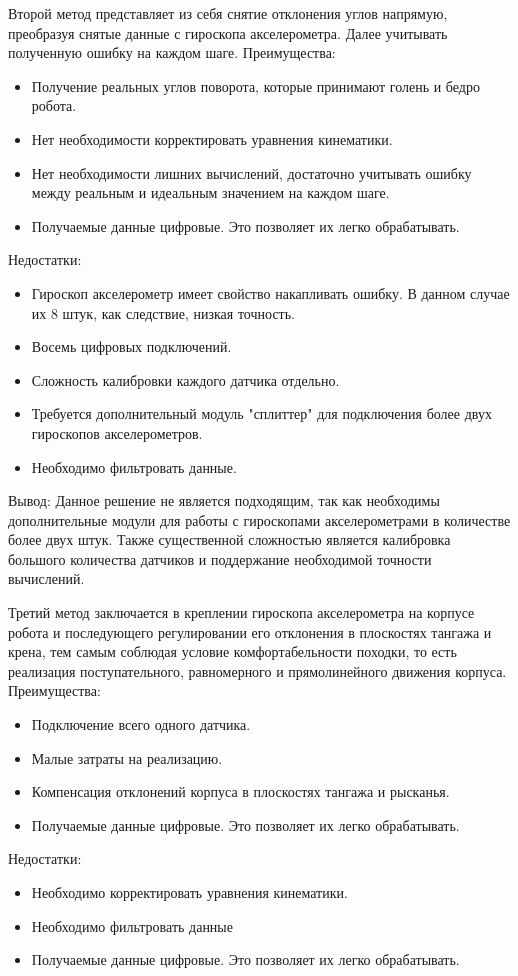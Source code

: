 Второй метод представляет из себя снятие отклонения углов напрямую, преобразуя снятые данные с гироскопа акселерометра. Далее учитывать полученную ошибку на каждом шаге.
\newline
Преимущества:
 \begin{itemize}
 	\item Получение реальных углов поворота, которые принимают голень и бедро робота.
 	\item Нет необходимости корректировать уравнения кинематики.
 	\item Нет необходимости лишних вычислений, достаточно учитывать ошибку между реальным и идеальным значением на каждом шаге.
 	\item Получаемые данные цифровые. Это позволяет их легко обрабатывать.
 \end{itemize}
Недостатки:
\begin{itemize}
\item Гироскоп акселерометр имеет свойство накапливать ошибку. В данном случае их 8 штук, как следствие, низкая точность.
\item Восемь цифровых подключений.
\item Сложность калибровки каждого датчика отдельно.
\item Требуется дополнительный модуль "сплиттер" для подключения более двух гироскопов акселерометров.
\item Необходимо фильтровать данные.
\end{itemize}
Вывод:
Данное решение не является подходящим, так как необходимы дополнительные модули для работы с гироскопами акселерометрами в количестве более двух штук. Также существенной сложностью является калибровка большого количества датчиков и поддержание необходимой точности вычислений.
\newline


Третий метод заключается в креплении гироскопа акселерометра на корпусе робота и последующего регулировании его отклонения в плоскостях тангажа и крена, тем самым соблюдая условие комфортабельности походки, то есть реализация поступательного, равномерного и прямолинейного движения корпуса.
\newline
Преимущества:
\begin{itemize}
	\item Подключение всего одного датчика.
	\item Малые затраты на реализацию.
	\item Компенсация отклонений корпуса в плоскостях тангажа и рысканья.
	\item Получаемые данные цифровые. Это позволяет их легко обрабатывать.
\end{itemize}
Недостатки:
\begin{itemize}
	\item Необходимо корректировать уравнения кинематики.
	\item Необходимо фильтровать данные
	\item Получаемые данные цифровые. Это позволяет их легко обрабатывать.
\end{itemize}

